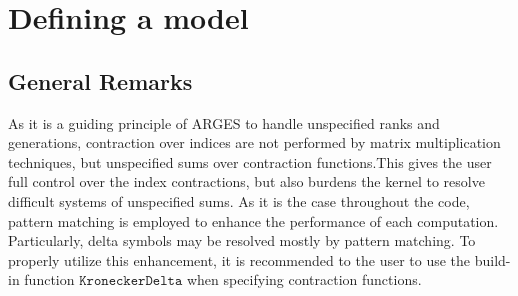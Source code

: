 \documentclass{scrartcl}
\begin{document}
\section{Defining a model}
\subsection{General Remarks}
As it is a guiding principle of ARGES to handle unspecified ranks and generations, contraction over indices are not performed by matrix multiplication techniques, but unspecified sums over contraction functions.This gives the user full control over the index contractions, but also burdens the kernel to resolve difficult systems of unspecified sums. As it is the case throughout the code, pattern matching is employed to enhance the performance of each computation. Particularly, delta symbols may be resolved mostly by pattern matching. To properly utilize this enhancement, it is recommended to the user to use the build-in function $\mathtt{KroneckerDelta}$ when specifying contraction functions. 
\end{document}
